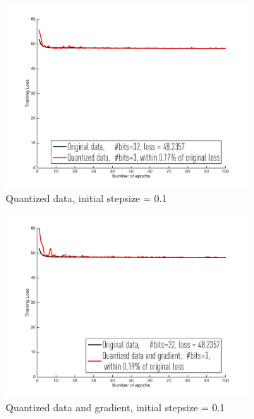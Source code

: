 \documentclass{article}
\begin{document}
\begin{figure}[h]
\centering
   
    \begin{subfigure}[h]{.3\columnwidth}
    \includegraphics[width=\columnwidth]{lr/real/cpusmall/d01}
    \caption{Quantized data, initial stepsize = 0.1}
    \end{subfigure}
    \begin{subfigure}[h]{.3\columnwidth}
    \includegraphics[width=\columnwidth]{lr/real/cpusmall/dg01}
    \caption{Quantized data and gradient, initial stepsize = 0.1}
    \end{subfigure}
    \begin{subfigure}[h]{.3\columnwidth}

\end{subfigure}
\end{figure}
\end{document}
